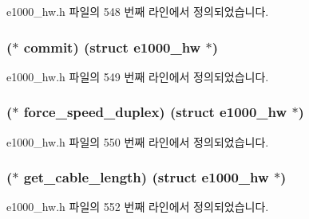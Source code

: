 e1000\+\_\+hw.\+h 파일의 548 번째 라인에서 정의되었습니다.

\subsubsection[{\texorpdfstring{commit}{commit}}]{($\ast$ commit) (struct {\bf e1000\+\_\+hw} $\ast$)}\hypertarget{structe1000__phy__operations_aa09068659dd86c6ac8c8eaf206c848b4}{}\label{structe1000__phy__operations_aa09068659dd86c6ac8c8eaf206c848b4}


e1000\+\_\+hw.\+h 파일의 549 번째 라인에서 정의되었습니다.

\subsubsection[{\texorpdfstring{force\+\_\+speed\+\_\+duplex}{force_speed_duplex}}]{($\ast$ force\+\_\+speed\+\_\+duplex) (struct {\bf e1000\+\_\+hw} $\ast$)}\hypertarget{structe1000__phy__operations_ab64c7048c4bdefd4c8b2d7a2ef740fa7}{}\label{structe1000__phy__operations_ab64c7048c4bdefd4c8b2d7a2ef740fa7}


e1000\+\_\+hw.\+h 파일의 550 번째 라인에서 정의되었습니다.

\subsubsection[{\texorpdfstring{get\+\_\+cable\+\_\+length}{get_cable_length}}]{($\ast$ get\+\_\+cable\+\_\+length) (struct {\bf e1000\+\_\+hw} $\ast$)}\hypertarget{structe1000__phy__operations_a5aefa6c2cf34fccb05ae967035ddcbb2}{}\label{structe1000__phy__operations_a5aefa6c2cf34fccb05ae967035ddcbb2}


e1000\+\_\+hw.\+h 파일의 552 번째 라인에서 정의되었습니다.

